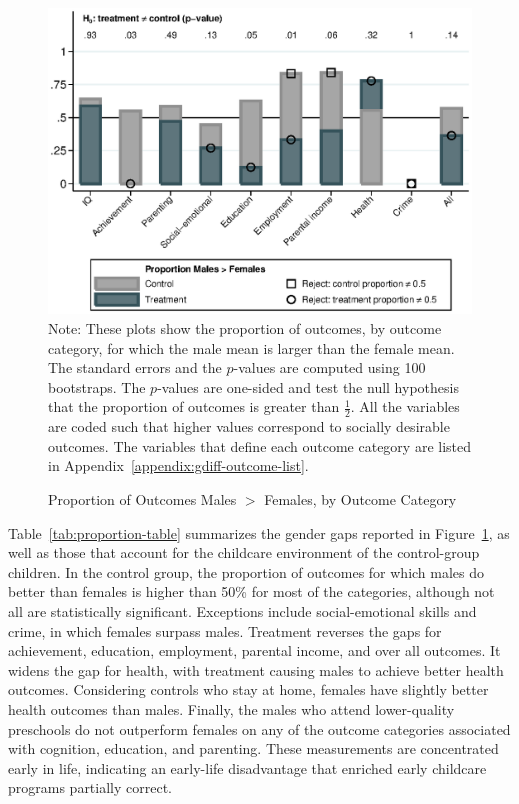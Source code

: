 \begin{figure}[!htbp]
\centering
\caption{Proportion of Outcomes Males $>$ Females, by Outcome Category}
\label{fig:proportion}
	\includegraphics[width=\textwidth]{output/gendergaps-treat-vs-fullcontrol}
\footnotesize \justify
Note: These plots show the proportion of outcomes, by outcome category, for which the male mean is larger than the female mean. The standard errors and the $p$-values are computed using 100 bootstraps. The $p$-values are one-sided and test the null hypothesis that the proportion of outcomes is greater than $\frac{1}{2}$. All the variables are coded such that higher values correspond to socially desirable outcomes. The variables that define each outcome category are listed in Appendix~\ref{appendix:gdiff-outcome-list}.
\end{figure}

Table~\ref{tab:proportion-table} summarizes the gender gaps reported in Figure~\ref{fig:proportion}, as well as those that account for the childcare environment of the control-group children. In the control group, the proportion of outcomes for which males do better than females is higher than 50\% for most of the categories, although not all are statistically significant. Exceptions include social-emotional skills and crime, in which females surpass males. Treatment reverses the gaps for achievement, education, employment, parental income, and over all outcomes. It widens the gap for health, with treatment causing males to achieve better health outcomes. Considering controls who stay at home, females have slightly better health outcomes than males. Finally, the males who attend lower-quality preschools do not outperform females on any of the outcome categories associated with cognition, education, and parenting. These measurements are concentrated early in life, indicating an early-life disadvantage that enriched early childcare programs partially correct.

